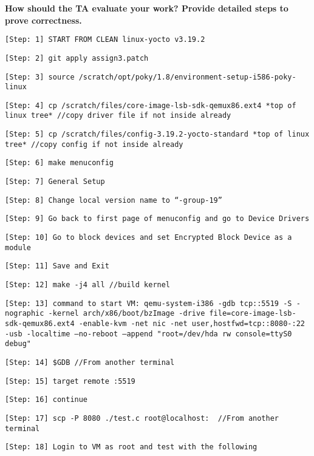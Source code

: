 \documentclass[10pt,letterpaper,draftclsnofoot,onecolumn]{IEEEtran}
\begin{document}
\noindent\textbf{How should the TA evaluate your work? Provide detailed steps to prove correctness.}
\begin{description}
\item \texttt{[Step: 1] START FROM CLEAN linux-yocto v3.19.2}
\item \texttt{[Step: 2] git apply assign3.patch}
\item \texttt{[Step: 3] source /scratch/opt/poky/1.8/environment-setup-i586-poky-linux}
\item \texttt{[Step: 4] cp /scratch/files/core-image-lsb-sdk-qemux86.ext4 *top of linux tree* \newline //copy driver file if not inside already}
\item \texttt{[Step: 5] cp /scratch/files/config-3.19.2-yocto-standard *top of linux tree* \newline//copy config if not inside already}
\item \texttt{[Step: 6] make menuconfig}
\item \texttt{[Step: 7] General Setup}
\item \texttt{[Step: 8] Change local version name to “-group-19”}
\item \texttt{[Step: 9] Go back to first page of menuconfig and go to Device Drivers}
\item \texttt{[Step: 10] Go to block devices and set Encrypted Block Device as a module}
\item \texttt{[Step: 11] Save and Exit}
\item \texttt{[Step: 12] make -j4 all \newline //build kernel}
\item \texttt{[Step: 13] command to start VM: \newline qemu-system-i386 -gdb tcp::5519 -S -nographic -kernel arch/x86/boot/bzImage -drive file=core-image-lsb-sdk-qemux86.ext4 -enable-kvm -net nic -net user,hostfwd=tcp::8080-:22 -usb -localtime --no-reboot --append "root=/dev/hda rw console=ttyS0 debug"}
\item \texttt{[Step: 14] \$GDB \newline //From another terminal}
\item \texttt{[Step: 15] target remote :5519}
\item \texttt{[Step: 16] continue}
\item \texttt{[Step: 17] scp -P 8080 ./test.c root@localhost:~ \newline //From another terminal}
\item \texttt{[Step: 18] Login to VM as root and test with the following}

\end{description}



\end{document}
